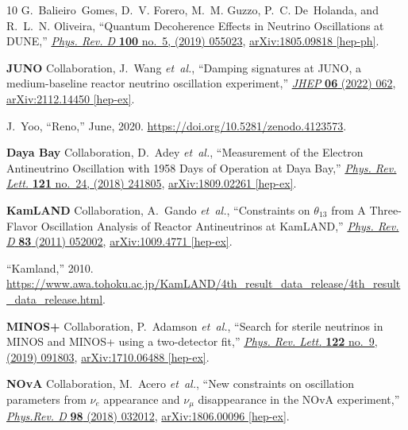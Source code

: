 \documentclass[aps, prd, onecolumn, tightenlines, notitlepage, superscriptaddress, nofootinbib, preprintnumbers, floatfix,showkeys,11pt]{revtex4-2}
\begin{document}
\begin{thebibliography}{10}
G.~Balieiro~Gomes, D.~V. Forero, M.~M. Guzzo, P.~C. De~Holanda, and R.~L.~N.
  Oliveira, ``{Quantum Decoherence Effects in Neutrino Oscillations at DUNE},''
  \href{http://dx.doi.org/10.1103/PhysRevD.100.055023}{{\em Phys. Rev. D}
  {\bfseries 100} no.~5, (2019) 055023},
  \href{http://arxiv.org/abs/1805.09818}{{\ttfamily arXiv:1805.09818
  [hep-ph]}}.

{\bfseries JUNO} Collaboration, J.~Wang {\em et~al.}, ``{Damping signatures at
  JUNO, a medium-baseline reactor neutrino oscillation experiment},''
  \href{http://dx.doi.org/10.1007/JHEP06(2022)062}{{\em JHEP} {\bfseries 06}
  (2022) 062}, \href{http://arxiv.org/abs/2112.14450}{{\ttfamily
  arXiv:2112.14450 [hep-ex]}}.

J.~Yoo, ``Reno,'' June, 2020.
\newblock \url{https://doi.org/10.5281/zenodo.4123573}.

{\bfseries Daya Bay} Collaboration, D.~Adey {\em et~al.}, ``{Measurement of the
  Electron Antineutrino Oscillation with 1958 Days of Operation at Daya Bay},''
  \href{http://dx.doi.org/10.1103/PhysRevLett.121.241805}{{\em Phys. Rev.
  Lett.} {\bfseries 121} no.~24, (2018) 241805},
  \href{http://arxiv.org/abs/1809.02261}{{\ttfamily arXiv:1809.02261
  [hep-ex]}}.

{\bfseries KamLAND} Collaboration, A.~Gando {\em et~al.}, ``{Constraints on
  $\theta_{13}$ from A Three-Flavor Oscillation Analysis of Reactor
  Antineutrinos at KamLAND},''
  \href{http://dx.doi.org/10.1103/PhysRevD.83.052002}{{\em Phys. Rev. D}
  {\bfseries 83} (2011) 052002},
  \href{http://arxiv.org/abs/1009.4771}{{\ttfamily arXiv:1009.4771 [hep-ex]}}.

``Kamland,'' 2010.
\newblock
  \url{https://www.awa.tohoku.ac.jp/KamLAND/4th_result_data_release/4th_result_data_release.html}.

{\bfseries MINOS+} Collaboration, P.~Adamson {\em et~al.}, ``{Search for
  sterile neutrinos in MINOS and MINOS+ using a two-detector fit},''
  \href{http://dx.doi.org/10.1103/PhysRevLett.122.091803}{{\em Phys. Rev.
  Lett.} {\bfseries 122} no.~9, (2019) 091803},
  \href{http://arxiv.org/abs/1710.06488}{{\ttfamily arXiv:1710.06488
  [hep-ex]}}.

{\bfseries NOvA} Collaboration, M.~Acero {\em et~al.}, ``{New constraints on
  oscillation parameters from $\nu_e$ appearance and $\nu_\mu$ disappearance in
  the NOvA experiment},''
  \href{http://dx.doi.org/10.1103/PhysRevD.98.032012}{{\em Phys.Rev. D}
  {\bfseries 98} (2018) 032012},
  \href{http://arxiv.org/abs/1806.00096}{{\ttfamily arXiv:1806.00096
  [hep-ex]}}.


\end{thebibliography}
\end{document}
